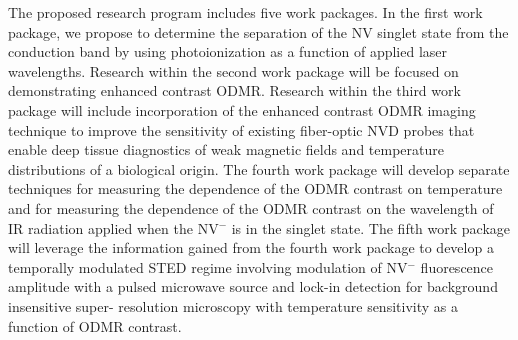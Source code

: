 The proposed research program includes five work packages.  In the first work package, we propose to determine 
the separation of the NV singlet state from the conduction band by using photoionization as a function of applied 
laser wavelengths.  Research within the second work package will be focused on demonstrating enhanced contrast 
ODMR.  Research within the third 
work package will include incorporation of the enhanced contrast ODMR imaging technique to improve the 
sensitivity of existing fiber-optic NVD probes that enable deep tissue diagnostics of weak magnetic fields and 
temperature distributions of a biological origin.  The fourth work package will develop separate techniques for 
measuring the dependence of the ODMR contrast on temperature and for measuring the dependence of the ODMR 
contrast on the wavelength of IR radiation applied when the NV$^-$ is in the singlet state.  The fifth work package 
will leverage the information gained from the fourth work package to develop a temporally modulated STED regime 
involving modulation of NV$^-$ fluorescence amplitude with a pulsed microwave source and lock-in detection for background insensitive super-
resolution microscopy with temperature sensitivity as a function of ODMR contrast.